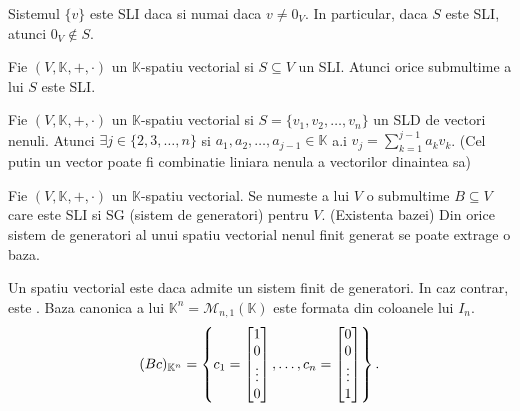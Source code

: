 \documentclass{article}
\begin{document}
\begin{enumerate}
\begin{tcolorbox}
\begin{enumerate}
\end{enumerate}
\end{tcolorbox}

\proprietate Sistemul $\{v\}$ este SLI daca si numai daca $v \neq 0_V$. In particular, daca $S$ este SLI, atunci $0_V \notin S$.

\proprietate Fie $(V, \mathbb{K}, +, \cdot)$ un $\mathbb{K}$-spatiu vectorial si $S \subseteq V$ un SLI. Atunci orice submultime a lui $S$ este SLI.

\propozitie Fie $(V, \mathbb{K}, +, \cdot)$ un $\mathbb{K}$-spatiu vectorial si $S = \{v_1, v_2, \dots, v_n\}$ un SLD de vectori nenuli. Atunci $\exists j \in \{2, 3, \dots, n\}$ si $a_1, a_2, \dots, a_{j-1} \in \mathbb{K}$ a.i $v_j = \sum_{k=1}^{j-1} a_k v_k$. (Cel putin un vector poate fi combinatie liniara nenula a vectorilor dinaintea sa)

\begin{tcolorbox}
   Fie $(V, \mathbb{K}, +, \cdot)$ un $\mathbb{K}$-spatiu vectorial. Se numeste  a lui $V$ o submultime $B \subseteq V$ care este SLI si SG (sistem de generatori) pentru $V$.
  \teorema (Existenta bazei) Din orice sistem de generatori al unui spatiu vectorial nenul finit generat se poate extrage o baza.
\end{tcolorbox}
  \observatie Un spatiu vectorial este  daca admite un sistem finit de generatori. In caz contrar, este .
  \exemplu Baza canonica a lui $\mathbb{K}^n = \mathcal{M}_{n, 1}(\mathbb{K})$ este formata din coloanele lui $I_n$.
  \[
    (Bc)_{\mathbb{K}^n} = \left\{
      c_1 = \begin{bmatrix}1 \\ 0 \\ \vdots \\ 0\end{bmatrix},
      \dots,
      c_n = \begin{bmatrix}0 \\ 0 \\ \vdots \\ 1\end{bmatrix}
    \right\}.
  \]


\end{enumerate}
\end{document}
